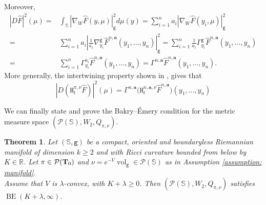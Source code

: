 \documentclass[10pt,leqno]{amsart}
\numberwithin{equation}{section}
\newtheorem{teorema}{Theorem}[section]
\newcommand{\R}{\mathbb{R}}
\newcommand{\PP}{\mathcal{P}}
\newcommand{\ttg}{\mathtt{g}}
\newcommand{\ttH}{\mathtt{H}}
\newcommand{\Ss}{\mathbb{S}}
\begin{document}
    Moreover, 
    \begin{equation}\label{eq: carre du champ transfer}
        \begin{aligned}
            |D\hat{F}|^2(\mu) = & \int_{\Ss} |\nabla_W \hat{F}(y,\mu)|_\ttg^2 d\mu(y) = \sum_{i=1}^n a_i  |\nabla_W \hat{F}(y_i,\mu)|_\ttg^2 
            \\
            = & 
            \sum_{i=1}^n a_i  \left|\frac{1}{a_i}\nabla_{y_i}^{\ttg}\hat{F}^{n,\mathbf{a}}(y_1,\dots,y_n)\right|_\ttg^2 = 
            \sum_{i=1}^n \frac{1}{a_i} \Gamma_{y_i}^{\ttg}\hat{F}^{n,\mathbf{a}}(y_1,\dots,y_n) 
            \\
            = & 
            \sum_{i=1}^n \Gamma_{y_i}^{a_i}\hat{F}^{n,\mathbf{a}}(y_1,\dots,y_n) = \Gamma^{n,\mathbf{a}} \hat{F}^{n,\mathbf{a}}(y_1,\dots,y_n).
        \end{aligned}
    \end{equation}
More generally, the intertwining property shown in \cite[Theorem 3.15]{delloschiavo2024massive}, gives that 
\begin{equation}\label{eq: intertwining}
    |D(\ttH^{\pi,\nu}_t \hat{F})|^2(\mu) = \Gamma^{n,\mathbf{a}}\big(\ttH^{n,\mathbf{a},\nu}_t \hat{F}^{n,\mathbf{a}}\big)(y_1,\dots,y_n)
\end{equation}

We can finally state and prove the Bakry--\'Emery condition for the metric measure space $(\PP(\Ss),W_2,Q_{\pi,\nu})$.

\begin{teorema}\label{thm: BE wass}
    Let $(\Ss,\ttg)$ be a compact, oriented and boundaryless Riemannian manifold of dimension $k\geq 2$ and with Ricci curvature bounded from below by $K\in \R$. Let $\pi\in \PP(\bold{T}_0)$ and $\nu = e^{-V}\operatorname{vol}_\ttg\in \PP(\Ss)$ as in Assumption \ref{assumption: manifold}.
    \\
    Assume that $V$ is $\lambda$-convex, with $K+\lambda\geq 0$. Then $(\PP(\Ss),W_2,Q_{\pi,\nu})$ satisfies $\operatorname{BE}(K+\lambda,\infty)$.
\end{teorema}
\end{document}
